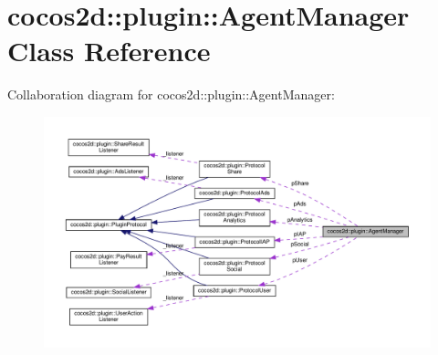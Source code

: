 \hypertarget{classcocos2d_1_1plugin_1_1AgentManager}{}\section{cocos2d\+:\+:plugin\+:\+:Agent\+Manager Class Reference}
\label{classcocos2d_1_1plugin_1_1AgentManager}


Collaboration diagram for cocos2d\+:\+:plugin\+:\+:Agent\+Manager\+:
\nopagebreak
\begin{figure}[H]
\begin{center}
\leavevmode
\includegraphics[width=350pt]{classcocos2d_1_1plugin_1_1AgentManager__coll__graph}
\end{center}
\end{figure}
